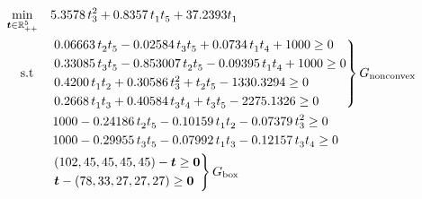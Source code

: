 \begin{align}
    \min_{\vct{t} \in \R^5_{++}} 
                & ~~~ 5.3578\, t_3^2 + 0.8357\, t_1^{} t_5^{} + 37.2393 t_1^{} %
                \label{prob:ex1} \\
    \text{s.t }
                & \begin{rcases}
                    &  0.06663\, t_2^{} t_5^{} -0.02584\, t_3^{} t_5^{} + 0.0734\, t_1^{} t_4^{} + 1000 \geq 0 \\
                    &  0.33085\, t_3^{} t_5^{} - 0.853007\, t_2^{} t_5^{} - 0.09395\, t_1^{} t_4^{} + 1000 \geq 0 \\
                    &  0.4200\, t_1^{} t_2^{} + 0.30586\, t_3^2 + t_2^{} t_5^{} - 1330.3294 \geq 0 \\
                    &   0.2668\, t_1^{} t_3^{} + 0.40584\, t_3^{} t_4^{} + t_3^{} t_5^{} - 2275.1326 \geq 0
                \end{rcases} G_{\text{nonconvex}}
                \nonumber \\
                & ~~~\, 1000 - 0.24186\, t_2^{} t_5^{} - 0.10159\, t_1^{} t_2^{} - 0.07379\, t_3^2 \geq 0
                \nonumber \\
                & ~~~\, 1000 - 0.29955\, t_3^{} t_5^{} - 0.07992\, t_1^{} t_3^{} - 0.12157\, t_3^{} t_4^{}  \geq 0 
                \nonumber \\
                & \begin{rcases}
                    & (102, 45, 45, 45, 45) - \vct{t} \geq \vct{0}\\
                    & \vct{t} - (78, 33, 27, 27, 27) \geq \vct{0}
                \end{rcases} G_{\text{box}} \nonumber
\end{align}
\iffalse
    Possible ways to improve alignment above: use (102 - t_1, 45 - t_2, ... ) etc.., so that the bound
    constraints are typeset in about as much space as the other constraints. Then I can choose to
    directly align the curly brackets. Also maybe I can use an "array" environment or something that
    lets me use multiple alignment characters.
\fi